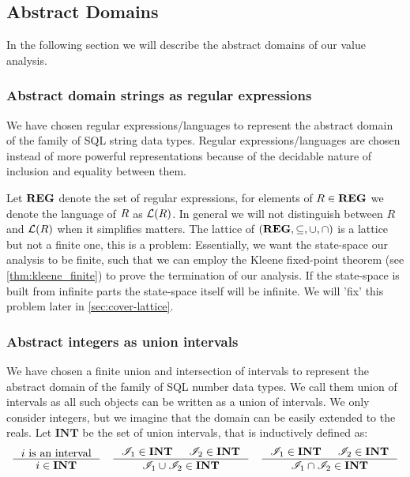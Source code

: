 \subsection{Abstract Domains}\label{subsec:abstract-domains}

In the following section we will describe the abstract domains of our value analysis.

\subsubsection{Abstract domain strings as regular expressions}\label{subsubsec:abstract_domains_strings}
We have chosen regular expressions/languages to represent the abstract domain of the family of SQL string data types.
Regular expressions/languages are chosen instead of more powerful representations because of the decidable nature of inclusion and equality between them.

Let $\mathbf{REG}$ denote the set of regular expressions, for elements of $R \in \mathbf{REG}$ we denote the language of $R$ as $\mathcal{L}(R)$.
In general we will not distinguish between $R$ and $\mathcal{L}(R)$ when it simplifies matters.
The lattice of $(\mathbf{REG}, \subseteq, \cup, \cap)$ is a lattice but not a finite one, this is a problem: Essentially, we want the state-space our analysis to be finite, such that we can employ the Kleene fixed-point theorem (see \autoref{thm:kleene_finite}) to prove the termination of our analysis.
If the state-space is built from infinite parts the state-space itself will be infinite.
We will 'fix' this problem later in \autoref{sec:cover-lattice}.

\subsubsection{Abstract integers as union intervals}\label{subsubsec:abstract_domains_numbers} We have chosen a finite union and intersection of intervals to represent the abstract domain of the family of SQL number data types.
We call them union of intervals as all such objects can be written as a union of intervals.
We only consider integers, but we imagine that the domain can be easily extended to the reals.
Let $\mathbf{INT}$ be the set of union intervals, that is inductively defined as:
\[
    \inference{i \text{ is an interval}}{i \in \mathbf{INT}} \quad
    \inference{\mathscr{I}_1 \in \textbf{INT} & \mathscr{I}_2 \in \textbf{INT}}{\mathscr{I}_1 \cup  \mathscr{I}_2 \in \mathbf{INT}} \quad
    \inference{\mathscr{I}_1 \in \textbf{INT} & \mathscr{I}_2 \in \textbf{INT}}{\mathscr{I}_1 \cap  \mathscr{I}_2 \in \mathbf{INT}}
\]

